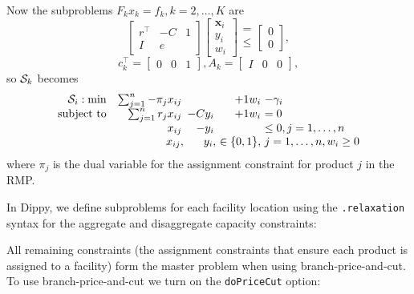 Now the subproblems $F_k x_k = f_k, k = 2, \ldots, K$ are
\[
\begin{bmatrix}
r^\top & -C & 1 \\
I & e 
\end{bmatrix} \begin{bmatrix}
\mathbf{x}_i \\
y_i \\
w_i
\end{bmatrix}
\begin{matrix}
= \\ \leq
\end{matrix}
\begin{bmatrix}
0 \\ 0
\end{bmatrix},
\]
\[ c_k^\top = \left[ \begin{array}{c|c|c} 0 & 0 & 1 \end{array} \right], A_k = \left[ \begin{array}{c|c|c} I & 0 & 0 \end{array} \right], \]
so ${\cal S}_k$ becomes
\[
\begin{array}{rr@{\ }r@{\ }r@{\ }l}
{\cal S}_i: \min  & \sum_{j=1}^n -\pi_j x_{ij} \, &           & +1 w_i & - \gamma_i \\
\text{subject to} & \sum_{j=1}^n r_j    x_{ij} \, & -C y_i \, & +1 w_i & = 0 \\
                  &                     x_{ij} \, & -  y_i \, &        & \leq 0, j = 1, \ldots, n \\
                  &                     x_{ij},   &    y_i,   & \in \{0, 1 \}, & j = 1, \ldots, n, w_i \geq 0
\end{array}
\]
where $\pi_j$ is the dual variable for the assignment constraint for product $j$ in the RMP.

\begin{sloppypar}In Dippy, we define subproblems for each facility location using the \lstinline{.relaxation} syntax for the aggregate and disaggregate capacity constraints:\end{sloppypar}


All remaining constraints (the assignment constraints that ensure each product is assigned to a facility) form the master problem when using branch-price-and-cut.
To use branch-price-and-cut we turn on the \lstinline{doPriceCut} option:



